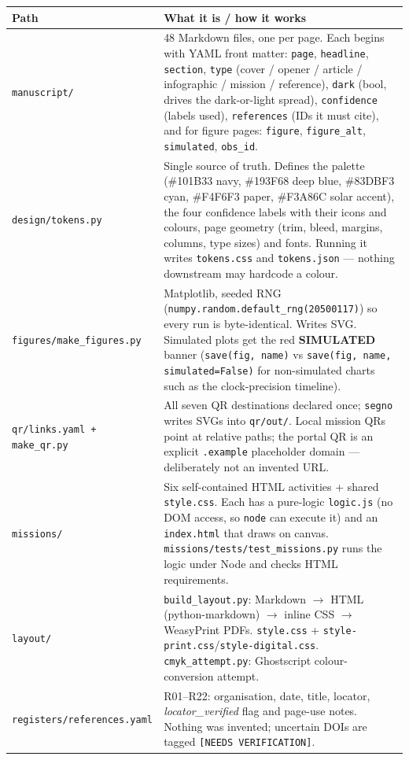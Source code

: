 \documentclass[11pt,a4paper]{article}
\newcommand{\code}[1]{\texttt{#1}}
\begin{document}
\begin{longtable}{p{44mm}p{102mm}}
\textbf{Path} & \textbf{What it is / how it works}\\
\endhead
\code{manuscript/} & 48 Markdown files, one per page. Each begins with YAML
front matter: \code{page}, \code{headline}, \code{section}, \code{type}
(cover / opener / article / infographic / mission / reference), \code{dark}
(bool, drives the dark-or-light spread), \code{confidence} (labels used),
\code{references} (IDs it must cite), and for figure pages: \code{figure},
\code{figure\_alt}, \code{simulated}, \code{obs\_id}.\\
\code{design/tokens.py} & Single source of truth. Defines the palette
(\#101B33 navy, \#193F68 deep blue, \#83DBF3 cyan, \#F4F6F3 paper, \#F3A86C
solar accent), the four confidence labels with their icons and colours, page
geometry (trim, bleed, margins, columns, type sizes) and fonts. Running it
writes \code{tokens.css} and \code{tokens.json} --- nothing downstream may
hardcode a colour.\\
\code{figures/make\_figures.py} & Matplotlib, seeded RNG
(\code{numpy.random.default\_rng(20500117)}) so every run is byte-identical.
Writes SVG. Simulated plots get the red \textbf{SIMULATED} banner
(\code{save(fig, name)} vs \code{save(fig, name, simulated=False)} for
non-simulated charts such as the clock-precision timeline).\\
\code{qr/links.yaml + make\_qr.py} & All seven QR destinations declared once;
\code{segno} writes SVGs into \code{qr/out/}. Local mission QRs point at
relative paths; the portal QR is an explicit \code{.example} placeholder
domain --- deliberately not an invented URL.\\
\code{missions/} & Six self-contained HTML activities + shared
\code{style.css}. Each has a pure-logic \code{logic.js} (no DOM access, so
\code{node} can execute it) and an \code{index.html} that draws on canvas.
\code{missions/tests/test\_missions.py} runs the logic under Node and checks
HTML requirements.\\
\code{layout/} & \code{build\_layout.py}: Markdown $\rightarrow$ HTML
(python-markdown) $\rightarrow$ inline CSS $\rightarrow$ WeasyPrint PDFs.
\code{style.css} + \code{style-print.css}/\code{style-digital.css}.
\code{cmyk\_attempt.py}: Ghostscript colour-conversion attempt.\\
\code{registers/references.yaml} & R01--R22: organisation, date, title,
locator, \emph{locator\_verified} flag and page-use notes. Nothing was
invented; uncertain DOIs are tagged \texttt{[NEEDS VERIFICATION]}.\\

\end{longtable}
\end{document}
